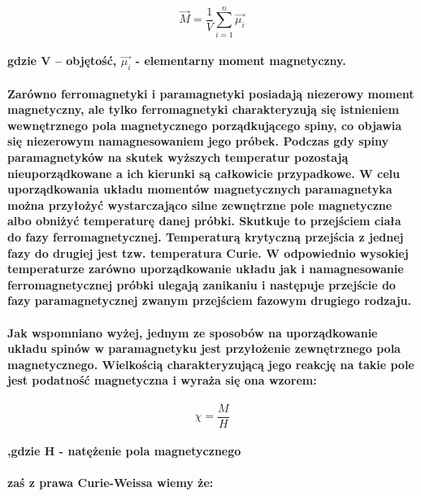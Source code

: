 \documentclass[a4paper,10pt]{article}
\begin{document}
\begin{equation}
\vec{M} =\frac{1}{V} \sum_{i=1}^n \vec{\mu_i}
\end{equation}
\paragraph{gdzie V – objętość, $\vec{\mu_i}$ - elementarny moment magnetyczny.}

\paragraph{Zarówno ferromagnetyki i paramagnetyki posiadają niezerowy moment magnetyczny, ale  tylko ferromagnetyki charakteryzują się istnieniem wewnętrznego pola magnetycznego porządkującego spiny, co objawia się niezerowym namagnesowaniem jego próbek. Podczas gdy spiny paramagnetyków na skutek wyższych temperatur pozostają nieuporządkowane a ich kierunki są całkowicie przypadkowe. W celu uporządkowania układu momentów magnetycznych paramagnetyka można przyłożyć wystarczająco silne zewnętrzne pole magnetyczne albo obniżyć temperaturę danej próbki. Skutkuje to przejściem ciała do fazy ferromagnetycznej. Temperaturą krytyczną przejścia z jednej fazy do drugiej jest tzw. temperatura Curie. W odpowiednio wysokiej temperaturze zarówno uporządkowanie układu jak i namagnesowanie ferromagnetycznej próbki ulegają zanikaniu i następuje przejście do fazy paramagnetycznej zwanym przejściem fazowym drugiego rodzaju.}

\paragraph{Jak wspomniano wyżej, jednym ze sposobów na uporządkowanie układu spinów w paramagnetyku jest przyłożenie zewnętrznego pola magnetycznego. Wielkością charakteryzującą jego reakcję na takie pole jest podatność magnetyczna i wyraża się ona wzorem:}

\begin{equation}
\chi = \frac{M}{H}
\end{equation}

\paragraph{,gdzie H - natężenie pola magnetycznego}

\paragraph{zaś z prawa Curie-Weissa wiemy że:}
\end{document}
